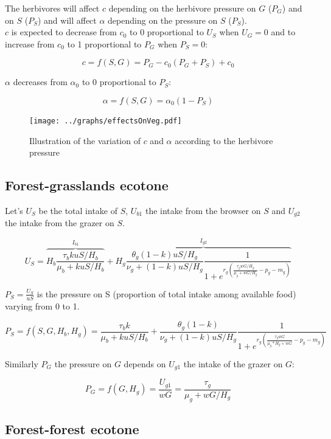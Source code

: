 The herbivores will affect $c$ depending on the herbivore pressure on $G$
($P_G$) and on $S$ ($P_S$) and will affect $\alpha$ depending on the pressure
on $S$ ($P_S$). \\ $c$ is expected to decrease from $c_0$ to 0 proportional to
$U_S$ when $U_G=0$ and to increase from $c_0$ to 1 proportional to $P_G$ when
$P_S=0$:

\[
c = f(S, G) = P_G - c_0(P_G+P_S) + c_0
\]

$\alpha$ decreases from $\alpha_0$ to 0 proportional to $P_S$:

\[
\alpha = f(S, G) = \alpha_0(1-P_S)
\]

\begin{figure}[h]
\begin{center}
\texttt{[image: ../graphs/effectsOnVeg.pdf]}
\caption{Illustration of the variation of $c$ and $\alpha$ according to the herbivore pressure}
\end{center}
\end{figure}

\subsection*{Forest-grasslands ecotone}

Let's $U_S$ be the total intake of $S$, $U_{b1}$ the intake from the browser on $S$ and $U_{g2}$ the intake from the grazer on $S$.

\[
U_S = \overbrace{H_b\frac{\tau_b kuS/H_b}{\mu_b+kuS/H_b}}^\text{$I_{b1}$} 
+ \overbrace{H_g\frac{\theta_g (1-k)uS/H_g}{\nu_g+(1-k)uS/H_g}\frac{1}{1+e^{r_g(\frac{\tau_g wG/H_g}{\mu_g+wG/H_g} - p_g - m_g)}}}^\text{$I_{g2}$}
\]

$P_S = \frac{U_S}{uS}$ is the pressure on S (proportion of total intake among available food) varying from 0 to 1.

\[
P_S = f(S, G, H_b, H_g) = \frac{\tau_b k}{\mu_b+kuS/H_b}
 + \frac{\theta_g (1-k)}{\nu_g+(1-k)uS/H_g}\frac{1}{1+e^{r_g(\frac{\tau_g wG}{\mu_g*H_g+wG} - p_g - m_g)}}
\]

Similarly $P_G$ the pressure on $G$ depends on $U_{g1}$ the intake of the grazer on $G$:

\[
P_G = f(G, H_g) =\frac{U_{g1}}{wG} = \frac{\tau_g}{\mu_g+wG/H_g}
\]


\subsection*{Forest-forest ecotone}

